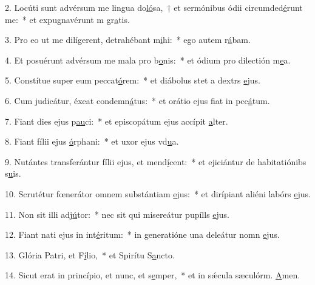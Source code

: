 2. Locúti sunt advérsum me lingua do\uline{ló}sa,~† et sermónibus ódii circumded\uline{é}runt me:~* et expugnavérunt m gr\uline{a}tis.\par 
3. Pro eo ut me dilígerent, detrahébant m\uline{i}hi:~* ego autem r\uline{á}bam.\par 
4. Et posuérunt advérsum me mala pro b\uline{o}nis:~* et ódium pro dilectión m\uline{e}a.\par 
5. Constítue super eum peccat\uline{ó}rem:~* et diábolus stet a dextrs \uline{e}jus.\par 
6. Cum judicátur, éxeat condemn\uline{á}tus:~* et orátio ejus fiat in pcc\uline{á}tum.\par 
7. Fiant dies ejus p\uline{au}ci:~* et episcopátum ejus accípit \uline{a}lter.\par 
8. Fiant fílii ejus \uline{ó}rphani:~* et uxor ejus vd\uline{u}a.\par 
9. Nutántes transferántur fílii ejus, et mend\uline{í}cent:~* et ejiciántur de habitatiónibs s\uline{u}is.\par 
10. Scrutétur fœnerátor omnem substántiam \uline{e}jus:~* et dirípiant aliéni labórs \uline{e}jus.\par 
11. Non sit illi adj\uline{ú}tor:~* nec sit qui misereátur pupílls \uline{e}jus.\par 
12. Fiant nati ejus in int\uline{é}ritum:~* in generatióne una deleátur nomn \uline{e}jus.\par 
13. Glória Patri, et F\uline{í}lio,~* et Spirítu S\uline{a}ncto.\par 
14. Sicut erat in princípio, et nunc, et s\uline{e}mper,~* et in sǽcula sæculórm. \uline{A}men.\par 
